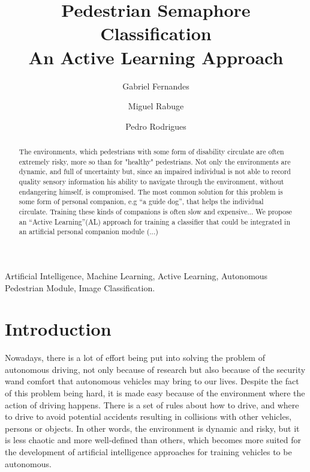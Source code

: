 \documentclass[journal, a4paper]{IEEEtran}
\begin{document}
\title{Pedestrian Semaphore Classification \\ An Active Learning Approach}
\author[1]{Gabriel Fernandes}
\author[2]{Miguel Rabuge}
\author[3]{Pedro Rodrigues}

{
  \makeatletter
  \renewcommand\AB@affilsepx{: \protect\Affilfont}
  \makeatother

}

\maketitle

\begin{abstract}
The environments, which pedestrians with some form of disability circulate are 
often extremely risky, more so than for "healthy" pedestrians. Not only the 
environments are dynamic, and full of uncertainty but, since an impaired 
individual is not able to record quality sensory information his ability to 
navigate through the environment, without endangering himself, is compromised.
The most common solution for this problem is some form of personal companion, 
e.g “a guide dog”, that helps the individual circulate. Training these kinds of 
companions is often slow and expensive... We propose an “Active Learning”(AL) 
approach for training a classifier that could be integrated in an artificial 
personal companion module (...)
\end{abstract}

\begin{keywords}
Artificial Intelligence, Machine Learning, Active Learning, Autonomous Pedestrian Module, 
Image Classification.
\end{keywords}

\section{Introduction}
Nowadays, there is a lot of effort being put into solving the problem of 
autonomous driving, not only because of research but also because of the security 
wand comfort that autonomous vehicles may bring to our lives. Despite the fact of 
this problem being hard, it is made easy because of the environment
where the action of driving happens. There is a set of rules about how to drive, 
and where to drive to avoid potential accidents resulting in collisions with 
other vehicles, persons or objects. In other words, the environment is dynamic 
and risky, but it is less chaotic and more well-defined than others, which becomes 
more suited for the development of artificial intelligence approaches for training 
vehicles to be autonomous. 
\end{document}
